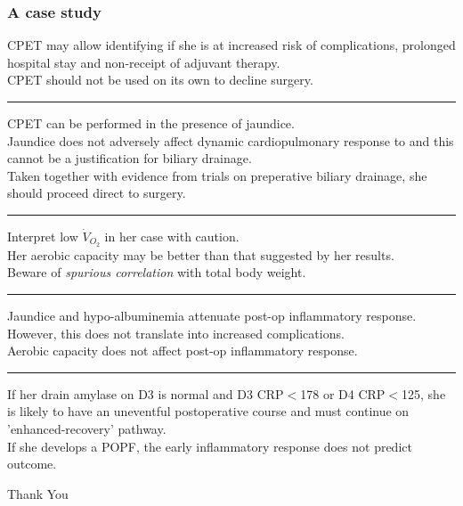 \documentclass[10pt]{beamer}
\begin{document}
\begin{frame}
	\frametitle{A case study}
	\begin{description}
	{\scriptsize 	
		\item [Chapter 2] CPET may allow identifying if she is at increased risk of complications, prolonged hospital stay and non-receipt of adjuvant therapy. 
					\\ CPET should not be used on its own to decline surgery. 
					\hrule
\pause
		\item [Chapter 3] CPET can be performed in the presence of jaundice. 
					\\ Jaundice does not adversely affect dynamic cardiopulmonary response to and this cannot be a justification for biliary drainage. 
					\\ Taken together with evidence from trials on preperative biliary drainage, she should proceed direct to surgery.
						\hrule
\pause
		\item [Chapter 4] Interpret low $\dot{V}_{O_2}$ in her case with caution. 
					\\ Her aerobic capacity may be better than that suggested by her results. 
					\\ Beware of \textit{spurious correlation} with total body weight.
						\hrule
\pause
		\item [Chapter 5] Jaundice and hypo-albuminemia attenuate post-op inflammatory response.
					\\ However, this does not translate into increased complications. 
					\\ Aerobic capacity does not affect post-op inflammatory response.
						\hrule
\pause
		\item [Chapter 6] If her drain amylase on D3 is normal and D3 CRP$<$178 or D4 CRP$<$125, she is likely to have an uneventful postoperative course and must continue on 'enhanced-recovery' pathway.
				\\ If she develops a POPF, the early inflammatory response does not predict outcome.
	}
	\end{description}
\end{frame}

\begin{frame}
\centerline{Thank You}
\end{frame}
\end{document}

